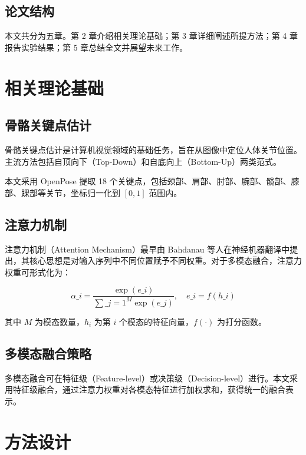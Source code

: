 \subsection{论文结构}\label{1-4-论文结构}

本文共分为五章。第 2 章介绍相关理论基础；第 3 章详细阐述所提方法；第 4 章报告实验结果；第 5 章总结全文并展望未来工作。


\section{相关理论基础}\label{第2章-相关理论基础}

\subsection{骨骼关键点估计}\label{2-1-骨骼关键点估计}

骨骼关键点估计是计算机视觉领域的基础任务，旨在从图像中定位人体关节位置。主流方法包括自顶向下（Top-Down）和自底向上（Bottom-Up）两类范式。


本文采用 OpenPose\cite{ref5} 提取 18 个关键点，包括颈部、肩部、肘部、腕部、髋部、膝部、踝部等关节，坐标归一化到 $[0, 1]$ 范围内。


\subsection{注意力机制}\label{2-2-注意力机制}

注意力机制（Attention Mechanism）最早由 Bahdanau 等人\cite{ref6}在神经机器翻译中提出，其核心思想是对输入序列中不同位置赋予不同权重。对于多模态融合，注意力权重可形式化为：


\begin{equation}
\alpha\_i = \frac{\exp(e\_i)}{\sum\_{j=1}^{M} \exp(e\_j)}, \quad e\_i = f(h\_i)
\end{equation}


其中 $M$ 为模态数量，$h_i$ 为第 $i$ 个模态的特征向量，$f(\cdot)$ 为打分函数。


\subsection{多模态融合策略}\label{2-3-多模态融合策略}

多模态融合可在特征级（Feature-level）或决策级（Decision-level）进行。本文采用特征级融合，通过注意力权重对各模态特征进行加权求和，获得统一的融合表示。


\section{方法设计}\label{第3章-方法设计}


